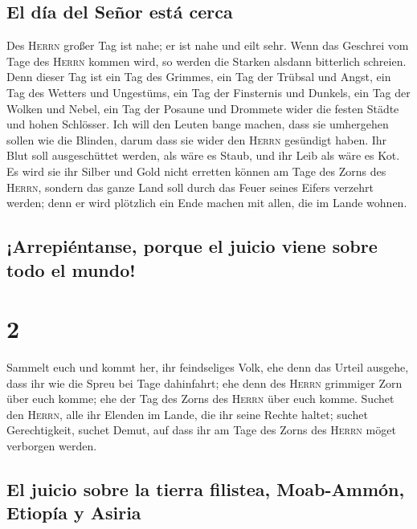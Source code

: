 \hypertarget{el-duxeda-del-seuxf1or-estuxe1-cerca}{%
\subsection{El día del Señor está
cerca}\label{el-duxeda-del-seuxf1or-estuxe1-cerca}}

 Des \textsc{Herrn} großer Tag ist nahe; er ist nahe und
eilt sehr. Wenn das Geschrei vom Tage des \textsc{Herrn} kommen wird, so
werden die Starken alsdann bitterlich schreien.  Denn
dieser Tag ist ein Tag des Grimmes, ein Tag der Trübsal und Angst, ein
Tag des Wetters und Ungestüms, ein Tag der Finsternis und Dunkels, ein
Tag der Wolken und Nebel,  ein Tag der Posaune und
Drommete wider die festen Städte und hohen Schlösser. 
Ich will den Leuten bange machen, dass sie umhergehen sollen wie die
Blinden, darum dass sie wider den \textsc{Herrn} gesündigt haben. Ihr
Blut soll ausgeschüttet werden, als wäre es Staub, und ihr Leib als wäre
es Kot.  Es wird sie ihr Silber und Gold nicht erretten
können am Tage des Zorns des \textsc{Herrn}, sondern das ganze Land soll
durch das Feuer seines Eifers verzehrt werden; denn er wird plötzlich
ein Ende machen mit allen, die im Lande wohnen.

\hypertarget{arrepiuxe9ntanse-porque-el-juicio-viene-sobre-todo-el-mundo}{%
\subsection{¡Arrepiéntanse, porque el juicio viene sobre todo el
mundo!}\label{arrepiuxe9ntanse-porque-el-juicio-viene-sobre-todo-el-mundo}}

\hypertarget{section-1}{%
\section{2}\label{section-1}}

 Sammelt euch und kommt her, ihr feindseliges Volk,
 ehe denn das Urteil ausgehe, dass ihr wie die Spreu bei
Tage dahinfahrt; ehe denn des \textsc{Herrn} grimmiger Zorn über euch
komme; ehe der Tag des Zorns des \textsc{Herrn} über euch komme.
 Suchet den \textsc{Herrn}, alle ihr Elenden im Lande, die
ihr seine Rechte haltet; suchet Gerechtigkeit, suchet Demut, auf dass
ihr am Tage des Zorns des \textsc{Herrn} möget verborgen werden.

\hypertarget{el-juicio-sobre-la-tierra-filistea-moab-ammuxf3n-etiopuxeda-y-asiria}{%
\subsection{El juicio sobre la tierra filistea, Moab-Ammón, Etiopía y
Asiria}\label{el-juicio-sobre-la-tierra-filistea-moab-ammuxf3n-etiopuxeda-y-asiria}}

